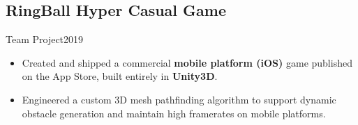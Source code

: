 \subsection{RingBall Hyper Casual Game}{Team Project}{2019}
\begin{itemize}
    \item Created and shipped a commercial \textbf{mobile platform (iOS)} game published on the App Store, built entirely in \textbf{Unity3D}.
    \item Engineered a custom 3D mesh pathfinding algorithm to support dynamic obstacle generation and maintain high framerates on mobile platforms.
\end{itemize}
